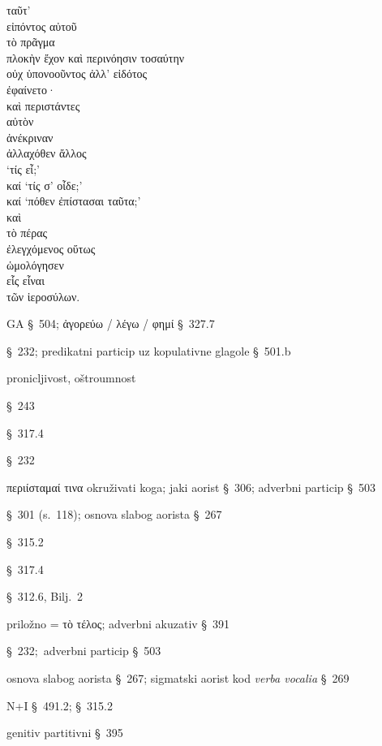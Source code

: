 
{\large
\begin{greek}
\noindent ταῦτ' \\
\tabto{2em} εἰπόντος αὐτοῦ \\
τὸ πρᾶγμα \\
\tabto{2em} πλοκὴν ἔχον καὶ περινόησιν τοσαύτην \\
οὐχ ὑπονοοῦντος ἀλλ' εἰδότος \\
\tabto{2em} ἐφαίνετο· \\
καὶ περιστάντες \\
\tabto{2em} αὐτὸν \\
ἀνέκριναν \\
\tabto{2em} ἀλλαχόθεν ἄλλος \\
‘τίς εἶ;’ \\
καί ‘τίς σ' οἶδε;’ \\
καί ‘πόθεν ἐπίστασαι ταῦτα;’ \\
καὶ \\
\tabto{2em} τὸ πέρας \\
\tabto{2em} ἐλεγχόμενος οὕτως \\
ὡμολόγησεν \\
\tabto{2em} εἷς εἶναι \\
\tabto{4em} τῶν ἱεροσύλων. \\

\end{greek}
}

\begin{description}[noitemsep]
\item[εἰπόντος αὐτοῦ] GA §~504; ἀγορεύω / λέγω / φημί §~327.7
\item[ἔχον] §~232; predikatni particip uz kopulativne glagole §~501.b
\item[περινόησιν] pronicljivost, oštroumnost
\item[ὑπονοοῦντος] §~243
\item[εἰδότος] §~317.4
\item[ἐφαίνετο] §~232
\item[περιστάντες] περιίσταμαί τινα okruživati koga; jaki aorist §~306; adverbni particip §~503
\item[ἀνέκριναν] §~301 (s.~118); osnova slabog aorista §~267  
\item[εἶ] §~315.2
\item[οἶδε] §~317.4
\item[ἐπίστασαι] §~312.6, Bilj.~2
\item[τὸ πέρας] priložno = τὸ τέλος; adverbni akuzativ §~391
\item[ἐλεγχόμενος] §~232; adverbni particip §~503
\item[ὡμολόγησεν] osnova slabog aorista §~267; sigmatski aorist kod \textit{verba vocalia} §~269
\item[εἷς εἶναι] N+I §~491.2; §~315.2
\item[τῶν ἱεροσύλων] genitiv partitivni §~395

\end{description}


